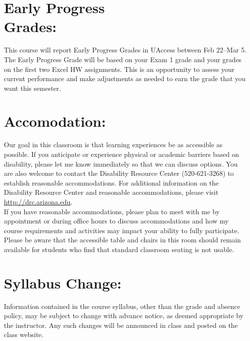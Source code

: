 \documentclass[11pt]{article}
\begin{document}
\vspace{0.5cm}


\section{\textbf{Early Progress\\ Grades:}}
\vspace{-1.3cm}
\hangindent=5cm 
This course will report Early Progress Grades in UAccess between Feb 22--Mar 5.  The Early Progress Grade will be based on your Exam 1 grade and your grades on the first two Excel HW assignments. This is an opportunity to assess your current performance and make adjustments as needed to earn the grade that you want this semester. 


\vspace{0.5cm}


\section{\textbf{Accomodation:}}
\vspace{-.65cm}
\hangindent=5cm 
Our goal in this classroom is that learning experiences be as accessible as possible. 
If you anticipate or experience physical or academic barriers based on disability, please let me know immediately so that we can discuss options. 
You are also welcome to contact the Disability Resource Center (520-621-3268) to establish reasonable accommodations. 
For additional information on the Disability Resource Center and reasonable accommodations, please visit \href{http://drc.arizona.edu}{http://drc.arizona.edu}.\\

\hangindent=5cm 
If you have reasonable accommodations, please plan to meet with me by appointment or during office hours to discuss accommodations and how my course requirements and activities may impact your ability to fully participate.
Please be aware that the accessible table and chairs in this room should remain available for students who find that standard classroom seating is not usable.


\vspace{0.5cm}


\section{\textbf{Syllabus Change:}}
\vspace{-.65cm}
\hangindent=5cm 
Information contained in the course syllabus, other than the grade and absence policy, may be subject to change with advance notice, as deemed appropriate by the instructor.
Any such changes will be announced in class and posted on the class website.
\end{document}
